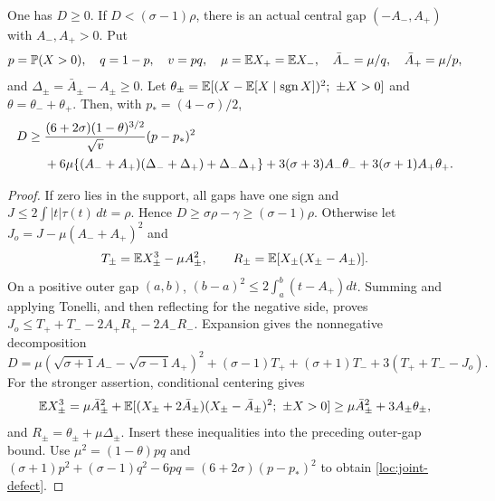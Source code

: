 \begin{lemma}\label{loc:defect}
One has $D\ge0$. If $D<(\sigma-1)\rho$, there is an actual central
gap $(-A_-,A_+)$ with $A_-,A_+>0$. Put
\[
 p=\mathbb P(X>0),\quad q=1-p,\quad v=pq,\quad
 \mu=\mathbb E X_+=\mathbb E X_-,\quad
 \bar A_-=\mu/q,\quad\bar A_+=\mu/p,
\]
and $\Delta_\pm=\bar A_\pm-A_\pm\ge0$.
Let $\theta_\pm=\mathbb E[(X-\mathbb E[X\mid\operatorname{sgn}X])^2;
\ \pm X>0]$ and $\theta=\theta_-+\theta_+$.
Then, with $p_*=(4-\sigma)/2$,
\begin{align}\label{loc:joint-defect}
 D\ge{}&\frac{(6+2\sigma)(1-\theta)^{3/2}}{\sqrt v}
                    (p-p_*)^2\notag\\
 &+6\mu\{(A_-+A_+)(\Delta_-+\Delta_+)+\Delta_-\Delta_+\}
 +3(\sigma+3)A_-\theta_-+3(\sigma+1)A_+\theta_+.
\end{align}
\end{lemma}
\begin{proof}
If zero lies in the support, all gaps have one sign and
$J\le2\int|t|\tau(t)\,dt=\rho$. Hence
$D\ge\sigma\rho-\gamma\ge(\sigma-1)\rho$.
Otherwise let $J_o=J-\mu(A_-+A_+)^2$ and
\[
 T_\pm=\mathbb E X_\pm^3-\mu A_\pm^2,
 \qquad R_\pm=\mathbb E[X_\pm(X_\pm-A_\pm)].
\]
On a positive outer gap $(a,b)$,
$(b-a)^2\le2\int_a^b(t-A_+)dt$.
Summing and applying Tonelli, and then reflecting for the negative
side, proves $J_o\le T_++T_--2A_+R_+-2A_-R_-$.
Expansion gives the nonnegative decomposition
\[
 D=\mu(\sqrt{\sigma+1}A_--\sqrt{\sigma-1}A_+)^2
 +(\sigma-1)T_++(\sigma+1)T_-+3(T_++T_--J_o).
\]
For the stronger assertion, conditional centering gives
\[
 \mathbb E X_\pm^3=\mu\bar A_\pm^2+
 \mathbb E[(X_\pm+2\bar A_\pm)(X_\pm-\bar A_\pm)^2;
                         \ \pm X>0]
 \ge\mu\bar A_\pm^2+3A_\pm\theta_\pm,
\]
and $R_\pm=\theta_\pm+\mu\Delta_\pm$.
Insert these inequalities into the preceding outer-gap bound.
Use $\mu^2=(1-\theta)pq$ and
$(\sigma+1)p^2+(\sigma-1)q^2-6pq
=(6+2\sigma)(p-p_*)^2$ to obtain \eqref{loc:joint-defect}.
\end{proof}

